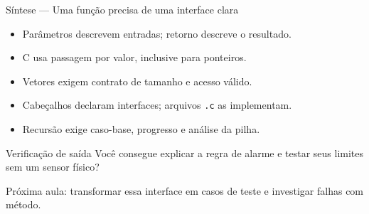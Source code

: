 \begin{frame}{Síntese — Uma função precisa de uma interface clara}
\begin{itemize}
\item Parâmetros descrevem entradas; retorno descreve o resultado.
\item C usa passagem por valor, inclusive para ponteiros.
\item Vetores exigem contrato de tamanho e acesso válido.
\item Cabeçalhos declaram interfaces; arquivos \texttt{.c} as implementam.
\item Recursão exige caso-base, progresso e análise da pilha.
\end{itemize}
\begin{block}{Verificação de saída}
Você consegue explicar a regra de alarme e testar seus limites sem um sensor físico?
\end{block}
\small Próxima aula: transformar essa interface em casos de teste e investigar falhas com método.
\end{frame}
